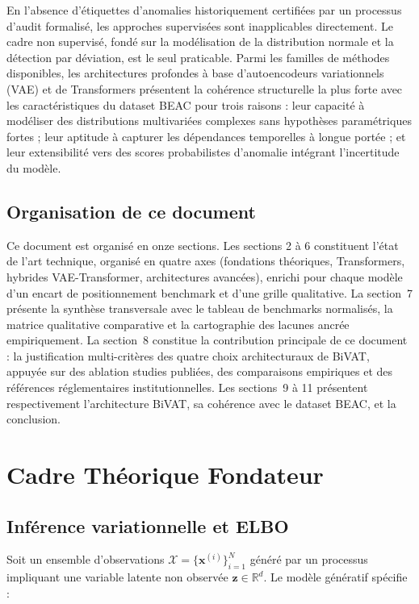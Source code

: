 \documentclass[12pt,a4paper]{article}
\begin{document}
En l'absence d'étiquettes d'anomalies historiquement certifiées par un processus
d'audit formalisé, les approches supervisées sont inapplicables directement. Le
cadre non supervisé, fondé sur la modélisation de la distribution normale et la
détection par déviation, est le seul praticable. Parmi les familles de méthodes
disponibles, les architectures profondes à base d'autoencodeurs variationnels
(VAE) et de Transformers présentent la cohérence structurelle la plus forte avec
les caractéristiques du dataset BEAC pour trois raisons : leur capacité à
modéliser des distributions multivariées complexes sans hypothèses paramétriques
fortes ; leur aptitude à capturer les dépendances temporelles à longue portée ;
et leur extensibilité vers des scores probabilistes d'anomalie intégrant
l'incertitude du modèle.

\subsection{Organisation de ce document}

Ce document est organisé en onze sections. Les sections 2 à 6 constituent
l'état de l'art technique, organisé en quatre axes (fondations théoriques,
Transformers, hybrides VAE-Transformer, architectures avancées), enrichi pour
chaque modèle d'un encart de positionnement benchmark et d'une grille qualitative.
La section~7 présente la synthèse transversale avec le tableau de benchmarks
normalisés, la matrice qualitative comparative et la cartographie des lacunes
ancrée empiriquement. La section~8 constitue la contribution principale de ce
document : la justification multi-critères des quatre choix architecturaux de
BiVAT, appuyée sur des ablation studies publiées, des comparaisons empiriques
et des références réglementaires institutionnelles. Les sections~9 à 11
présentent respectivement l'architecture BiVAT, sa cohérence avec le dataset
BEAC, et la conclusion.

\section{Cadre Théorique Fondateur}

\subsection{Inférence variationnelle et ELBO}

Soit un ensemble d'observations $\mathcal{X} = \{\mathbf{x}^{(i)}\}_{i=1}^{N}$
généré par un processus impliquant une variable latente non observée
$\mathbf{z} \in \mathbb{R}^d$. Le modèle génératif spécifie :
\end{document}
